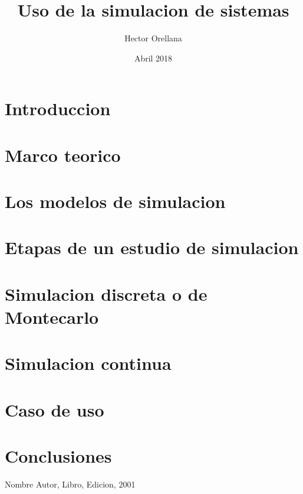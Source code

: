 \documentclass[twocolumn]{article}
\title{\textbf{Uso de la simulacion de sistemas}}
\date{Abril 2018}
\author{Hector Orellana}
\begin{document}
  \maketitle

  \section{Introduccion}

  \section{Marco teorico}

  \section{Los modelos de simulacion}

  \section{Etapas de un estudio de simulacion}

  \section{Simulacion discreta o de Montecarlo}

  \section{Simulacion continua}

  \section{Caso de uso}

  \section{Conclusiones}

  \begin{thebibliography}{9}
      Nombre Autor,
      Libro,
      Edicion,
      2001
  \end{thebibliography}
  
\end{document}
